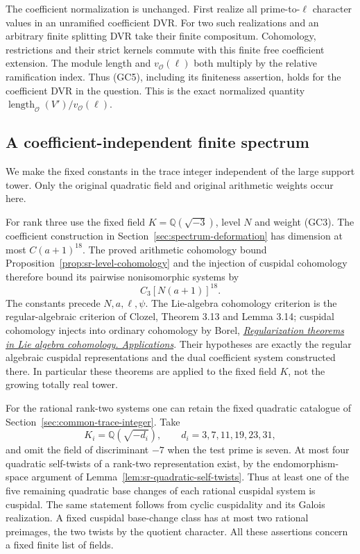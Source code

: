 The coefficient normalization is unchanged.
First realize all prime-to-\(\ell\) character
values in an unramified coefficient DVR.
For two such realizations and an arbitrary
finite splitting DVR take their finite
compositum. Cohomology, restrictions and
their strict kernels commute with this finite
free coefficient extension.
The module length and
\(v_{\mathcal O}(\ell)\) both multiply
by the relative ramification index.
Thus (GC5), including its finiteness
assertion, holds for the coefficient DVR
in the question.
This is the exact normalized quantity
\(\operatorname{length}_{\mathcal O}(V')/
  v_{\mathcal O}(\ell)\).

\subsection{A coefficient-independent finite spectrum}
We make the fixed constants in the trace
integer independent of the large support
tower. Only the original quadratic field
and original arithmetic weights occur here.

For rank three use the fixed field
\(K=\mathbb Q(\sqrt{-3})\), level \(N\)
and weight (GC3).
The coefficient construction in
Section~\ref{sec:spectrum-deformation}
has dimension at most \(C(a+1)^{18}\).
The proved arithmetic cohomology bound
Proposition~\ref{prop:sr-level-cohomology}
and the injection of cuspidal cohomology
therefore bound its pairwise nonisomorphic
systems by
\[
                           C_3[N(a+1)]^{18}.               \tag{GC6}
\]
The constants precede \(N,a,\ell,\psi\).
The Lie-algebra cohomology criterion is the
regular-algebraic criterion of Clozel,
Theorem 3.13 and Lemma 3.14; cuspidal
cohomology injects into ordinary cohomology
by Borel,
\href{https://doi.org/10.1215/S0012-7094-83-05028-7}
{\emph{Regularization theorems in Lie algebra
cohomology. Applications}}.
Their hypotheses are exactly the regular
algebraic cuspidal representations and
the dual coefficient system constructed
there.
In particular these theorems are applied
to the fixed field \(K\), not the growing
totally real tower.

For the rational rank-two systems one can
retain the fixed quadratic catalogue of
Section~\ref{sec:common-trace-integer}.
Take
\[
 K_i=\mathbb Q(\sqrt{-d_i}),\qquad
              d_i=3,7,11,19,23,31,
\]
and omit the field of discriminant \(-7\)
when the test prime is seven.
At most four quadratic self-twists of a
rank-two representation exist, by the
endomorphism-space argument of
Lemma~\ref{lem:sr-quadratic-self-twists}.
Thus at least one of the five remaining
quadratic base changes of each rational
cuspidal system is cuspidal.
The same statement follows from cyclic
cuspidality and its Galois realization.
A fixed cuspidal base-change class has
at most two rational preimages, the two
twists by the quotient character.
All these assertions concern a fixed
finite list of fields.

